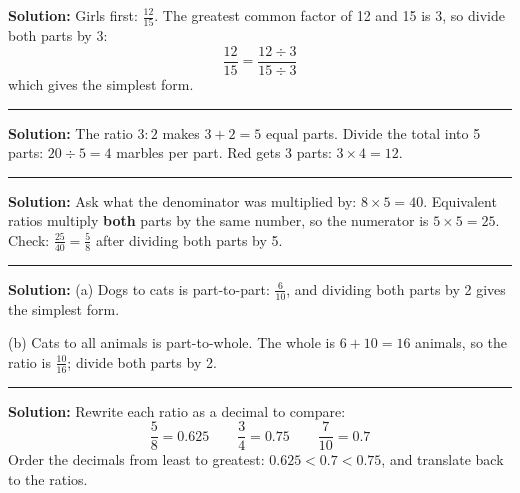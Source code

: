 \documentclass[12pt]{article}
\begin{document}

\textbf{Solution:} Girls first: $\frac{12}{15}$. The greatest common factor of 12
and 15 is 3, so divide both parts by 3:
\[ \frac{12}{15} = \frac{12 \div 3}{15 \div 3} \]
which gives the simplest form. 

\vspace{0.3cm}\noindent\rule{\linewidth}{0.2pt}\vspace{0.3cm}


\textbf{Solution:} The ratio $3{:}2$ makes $3 + 2 = 5$ equal parts. Divide the
total into 5 parts: $20 \div 5 = 4$ marbles per part. Red gets 3 parts:
$3 \times 4 = 12$. 

\vspace{0.3cm}\noindent\rule{\linewidth}{0.2pt}\vspace{0.3cm}


\textbf{Solution:} Ask what the denominator was multiplied by: $8 \times 5 = 40$.
Equivalent ratios multiply \textbf{both} parts by the same number, so the
numerator is $5 \times 5 = 25$. Check: $\frac{25}{40} = \frac{5}{8}$
after dividing both parts by 5. 

\vspace{0.3cm}\noindent\rule{\linewidth}{0.2pt}\vspace{0.3cm}


\textbf{Solution:} (a) Dogs to cats is part-to-part: $\frac{6}{10}$, and dividing
both parts by 2 gives the simplest form. 

(b) Cats to all animals is part-to-whole. The whole is $6 + 10 = 16$ animals, so
the ratio is $\frac{10}{16}$; divide both parts by 2. 

\vspace{0.3cm}\noindent\rule{\linewidth}{0.2pt}\vspace{0.3cm}


\textbf{Solution:} Rewrite each ratio as a decimal to compare:
\[ \frac{5}{8} = 0.625 \qquad \frac{3}{4} = 0.75 \qquad \frac{7}{10} = 0.7 \]
Order the decimals from least to greatest: $0.625 < 0.7 < 0.75$, and translate
back to the ratios. 
\end{document}
